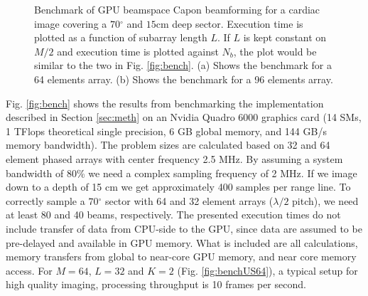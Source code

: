 \documentclass[12pt,journal,onecolumn]{IEEEtran}
\newcommand{\degree}{\ensuremath{^\circ}}
\begin{document}
\begin{figure}[!t]
\centerline{
\hfil
{}}
\caption{Benchmark of GPU beamspace Capon beamforming for a cardiac image covering a $70 \degree$ and $15$cm deep sector. Execution time is plotted as a function of subarray length $L$.  If $L$ is kept constant on $M/2$ and execution time is plotted against $N_b$, the plot would be similar to the two in Fig. \ref{fig:bench}. (a) Shows the benchmark for a 64 elements array. (b) Shows the benchmark for a 96 elements array.}
\label{fig:benchBS}
\end{figure}

Fig. \ref{fig:bench} shows the results from benchmarking the implementation described in Section \ref{sec:meth} on an Nvidia Quadro 6000 graphics card (14 SMs, 1 TFlops theoretical single precision, 6 GB global memory, and 144 GB/s memory bandwidth). The problem sizes are calculated based on 32 and 64 element phased arrays with center frequency 2.5 MHz. By assuming a system bandwidth of 80\% we need a complex sampling frequency of 2 MHz. If we image down to a depth of 15 cm we get approximately 400 samples per range line. To correctly sample a $70\degree$ sector with 64 and 32 element arrays ($\lambda/2$ pitch), we need at least 80 and 40 beams, respectively. The presented execution times do not include transfer of data from CPU-side to the GPU, since data are assumed to be pre-delayed and available in GPU memory. What is included are all calculations, memory transfers from global to near-core GPU memory, and near core memory access. For $M=64$, $L=32$ and $K=2$ (Fig. \ref{fig:benchUS64}), a typical setup for high quality imaging, processing throughput is 10 frames per second. 
\end{document}
